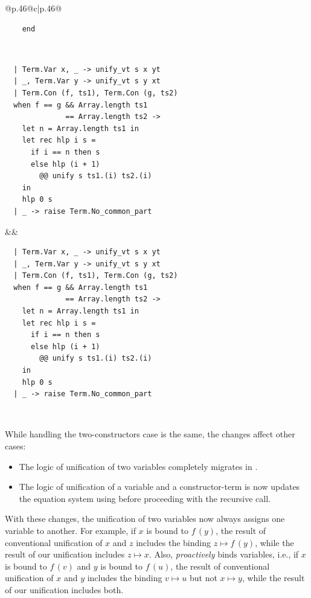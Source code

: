 \begin{center}
\begin{longtable}{@{}p{}@{\extracolsep{\fill}}c|p{}@{}}
\begin{verbatim}
    end
        \end{verbatim}
        \\
        \begin{verbatim}
  | Term.Var x, _ -> unify_vt s x yt
  | _, Term.Var y -> unify_vt s y xt
  | Term.Con (f, ts1), Term.Con (g, ts2)
  when f == g && Array.length ts1
              == Array.length ts2 ->
    let n = Array.length ts1 in
    let rec hlp i s =
      if i == n then s
      else hlp (i + 1)
        @@ unify s ts1.(i) ts2.(i)
    in
    hlp 0 s
  | _ -> raise Term.No_common_part
        \end{verbatim}
        &&
        \begin{verbatim}
  | Term.Var x, _ -> unify_vt s x yt
  | _, Term.Var y -> unify_vt s y xt
  | Term.Con (f, ts1), Term.Con (g, ts2)
  when f == g && Array.length ts1
              == Array.length ts2 ->
    let n = Array.length ts1 in
    let rec hlp i s =
      if i == n then s
      else hlp (i + 1)
        @@ unify s ts1.(i) ts2.(i)
    in
    hlp 0 s
  | _ -> raise Term.No_common_part
        \end{verbatim}
        \\
    \end{longtable}
\end{center}

While handling the two-constructors case is the same, the changes affect other cases:

\begin{itemize}
    \item The logic of unification of two variables completely migrates in \union.
    \item The logic of unification of a variable and a constructor-term is now updates the equation system using \commonpart before proceeding with the recursive call. 
\end{itemize}

With these changes, the unification of two variables now always assigns one variable to another.
For example, if $x$ is bound to $f\,(y)$, the result of conventional unification of $x$ and $z$ includes the binding $z \mapsto f\,(y)$, while the result of our unification includes $z \mapsto x$.
Also, \union \textit{proactively} binds variables, i.e., if $x$ is bound to $f\,(v)$ and $y$ is bound to $f\,(u)$, the result of conventional unification of $x$ and $y$ includes the binding $v \mapsto u$ but not $x \mapsto y$, while the result of our unification includes both.

